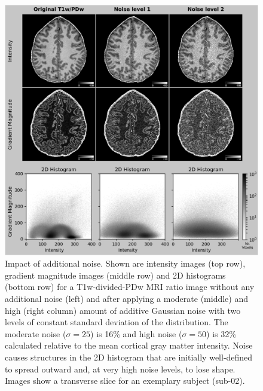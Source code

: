 \begin{figure}[htbp!]
\centering
\includegraphics[width=\textwidth]{figures/chapter_02_SI/supp_gramag_histograms_with_noise.png}
\caption{Impact of additional noise. Shown are intensity images (top row), gradient magnitude images (middle row) and 2D histograms (bottom row) for a T1w-divided-PDw MRI ratio image without any additional noise (left) and after applying a moderate (middle) and high (right column) amount of additive Gaussian noise with two levels of constant standard deviation of the distribution. The moderate noise ($\sigma=25$) is 16\% and high noise ($\sigma=50$) is 32\% calculated relative to the mean cortical gray matter intensity. Noise causes structures in the 2D histogram that are initially well-defined to spread outward and, at very high noise levels, to lose shape. Images show a transverse slice for an exemplary subject (sub-02).}
\label{fig:S2_Fig}
\end{figure}

